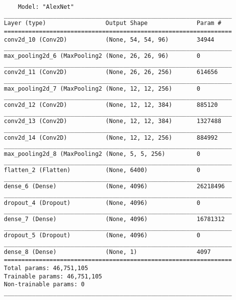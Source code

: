 \begin{verbatim}
    Model: "AlexNet"
_________________________________________________________________
Layer (type)                 Output Shape              Param #   
=================================================================
conv2d_10 (Conv2D)           (None, 54, 54, 96)        34944     
_________________________________________________________________
max_pooling2d_6 (MaxPooling2 (None, 26, 26, 96)        0         
_________________________________________________________________
conv2d_11 (Conv2D)           (None, 26, 26, 256)       614656    
_________________________________________________________________
max_pooling2d_7 (MaxPooling2 (None, 12, 12, 256)       0         
_________________________________________________________________
conv2d_12 (Conv2D)           (None, 12, 12, 384)       885120    
_________________________________________________________________
conv2d_13 (Conv2D)           (None, 12, 12, 384)       1327488   
_________________________________________________________________
conv2d_14 (Conv2D)           (None, 12, 12, 256)       884992    
_________________________________________________________________
max_pooling2d_8 (MaxPooling2 (None, 5, 5, 256)         0         
_________________________________________________________________
flatten_2 (Flatten)          (None, 6400)              0         
_________________________________________________________________
dense_6 (Dense)              (None, 4096)              26218496  
_________________________________________________________________
dropout_4 (Dropout)          (None, 4096)              0         
_________________________________________________________________
dense_7 (Dense)              (None, 4096)              16781312  
_________________________________________________________________
dropout_5 (Dropout)          (None, 4096)              0         
_________________________________________________________________
dense_8 (Dense)              (None, 1)                 4097      
=================================================================
Total params: 46,751,105
Trainable params: 46,751,105
Non-trainable params: 0
_________________________________________________________________
\end{verbatim}

